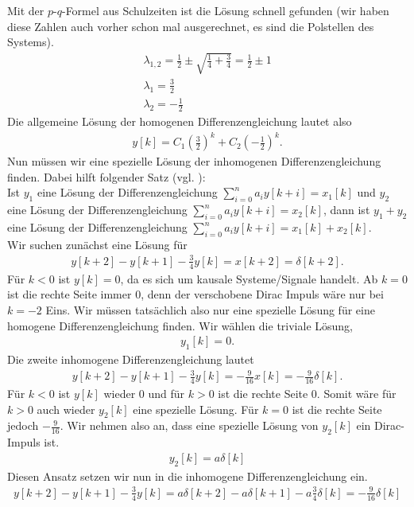 \documentclass[11pt,a4paper,DIV=12]{scrartcl}
\begin{document}
%
Mit der $p$-$q$-Formel aus Schulzeiten ist die Lösung schnell gefunden
(wir haben diese Zahlen auch vorher schon mal ausgerechnet, es sind die
Polstellen des Systems).
%
\begin{gather}
	\lambda_{1,2}=\frac{1}{2}\pm \sqrt{\frac{1}{4}+\frac{3}{4}}=\frac{1}{2}\pm 1\\
	\lambda_1=\frac{3}{2}\\
	\lambda_2=-\frac{1}{2}
\end{gather}
%
Die allgemeine Lösung der homogenen Differenzengleichung lautet also
%
\begin{gather}
	y[k]=C_1\left(\frac{3}{2}\right)^k+C_2\left(-\frac{1}{2}\right)^k.
\end{gather}
%
Nun müssen wir eine spezielle Lösung der inhomogenen Differenzengleichung
finden.
%
Dabei hilft folgender Satz (vgl. \cite[Kap. 5 S. 83]{Witt2013}):\\
%
Ist $y_1$ eine Lösung der Differenzengleichung $\sum_{i=0}^na_iy[k+i]=x_1[k]$
und $y_2$ eine Lösung der Differenzengleichung $\sum_{i=0}^na_iy[k+i]=x_2[k]$,
dann ist $y_1+y_2$ eine Lösung der Differenzengleichung
$\sum_{i=0}^{n}a_iy[k+i]=x_1[k]+x_2[k]$.\\
%
Wir suchen zunächst eine Lösung für
%
\begin{gather}
	y[k+2]-y[k+1]-\frac{3}{4}y[k]=x[k+2]=\delta[k+2].
\end{gather}
%
Für $k<0$ ist $y[k]=0$, da es sich um kausale Systeme/Signale handelt.
%
Ab $k=0$ ist die rechte Seite immer $0$, denn der verschobene Dirac Impuls wäre
nur bei $k=-2$ Eins. Wir müssen tatsächlich also nur eine spezielle Lösung für
eine homogene Differenzengleichung finden.
%
Wir wählen die triviale Lösung,
%
\begin{gather}
	y_1[k]=0.
\end{gather}
%
Die zweite inhomogene Differenzengleichung lautet
%
\begin{gather}
	y[k+2]-y[k+1]-\frac{3}{4}y[k]=-\frac{9}{16}x[k]=-\frac{9}{16}\delta[k].
\end{gather}
%
Für $k<0$ ist $y[k]$ wieder $0$ und für $k>0$ ist die rechte Seite $0$.
%
Somit wäre für $k>0$ auch wieder $y_2[k]$ eine spezielle Lösung.
%
Für $k=0$ ist die rechte Seite jedoch $-\frac{9}{16}$.
%
Wir nehmen also an, dass eine spezielle Lösung von $y_2[k]$ ein
Dirac-Impuls ist.
%
\begin{gather}
	y_2[k]=a\delta[k]
\end{gather}
%
Diesen Ansatz setzen wir nun in die inhomogene Differenzengleichung ein.
%
\begin{gather}
	y[k+2]-y[k+1]-\frac{3}{4}y[k]=a\delta[k+2]-a\delta[k+1]-a\frac{3}{4}\delta[k]=-\frac{9}{16}\delta[k]
\end{gather}
\end{document}
